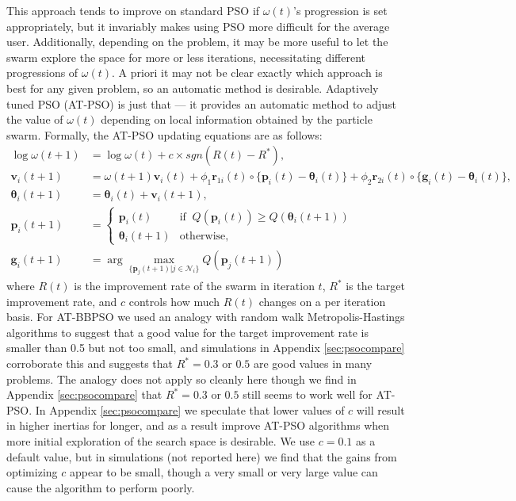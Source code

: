 \documentclass[12pt]{article}
\begin{document}
This approach tends to improve on standard PSO if $\omega(t)$'s progression is set appropriately, but it invariably makes using PSO more difficult for the average user. Additionally, depending on the problem, it may be more useful to let the swarm explore the space for more or less iterations, necessitating different progressions of $\omega(t)$. A priori it may not be clear exactly which approach is best for any given problem, so an automatic method is desirable. Adaptively tuned PSO (AT-PSO) is just that --- it provides an automatic method to adjust the value of $\omega(t)$ depending on local information obtained by the particle swarm. Formally, the AT-PSO updating equations are as follows:
\begin{align}\label{eq:atpso}
\log\omega(t+1)& = \log\omega(t) + c\times sgn(R(t) - R^*),\nonumber\\
\bm{v}_i(t+1) &= \omega(t+1) \bm{v}_i(t) + \phi_1 \bm{r}_{1i}(t)\circ\{\bm{p}_i(t) - \bm{\theta}_i(t)\} + \phi_2 \bm{r}_{2i}(t)\circ\{\bm{g}_i(t) - \bm{\theta}_i(t)\},\nonumber\\
\bm{\theta}_i(t+1) &= \bm{\theta}_i(t) + \bm{v}_i(t+1),\nonumber\\
\bm{p}_i(t+1) &= \begin{cases} \bm{p}_i(t)   & \mbox{if }\  Q(\bm{p}_i(t)) \ge Q(\bm{\theta}_i(t + 1))\\
                               \bm{\theta}_i(t+1) & \mbox{otherwise},
\end{cases}\nonumber\\
\bm{g}_i(t+1) &= \arg\max_{\{\bm{p}_j(t+1)|j\in\mathcal{N}_i\}}Q(\bm{p}_j(t+1))
\end{align}
where $R(t)$ is the improvement rate of the swarm in iteration $t$, $R^*$ is the target improvement rate, and $c$ controls how much $R(t)$ changes on a per iteration basis. For AT-BBPSO we used an analogy with random walk Metropolis-Hastings algorithms to suggest that a good value for the target improvement rate is smaller than 0.5 but not too small, and simulations in Appendix \ref{sec:psocompare} corroborate this and suggests that $R^*=0.3$ or $0.5$ are good values in many problems. The analogy does not apply so cleanly here though we find in Appendix \ref{sec:psocompare} that $R^*=0.3$ or $0.5$ still seems to work well for AT-PSO. In Appendix \ref{sec:psocompare} we speculate that lower values of $c$ will result in higher inertias for longer, and as a result improve AT-PSO algorithms when more initial exploration of the search space is desirable. We use $c=0.1$ as a default value, but in simulations (not reported here) we find that the gains from optimizing $c$ appear to be small, though a very small or very large value can cause the algorithm to perform poorly.
\end{document}
